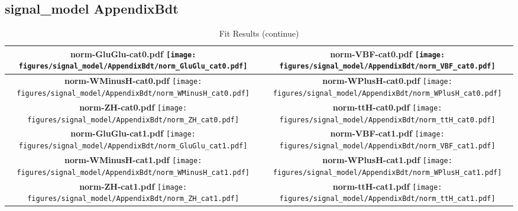 \subsection{signal\_model AppendixBdt}
\begin{longtable}{|c|c|}
\caption{Fit Results}
\endfirsthead
\caption{Fit Results (continue)}
\endhead
\hline
\parbox{0.47\textwidth}{
\centering
{\bfseries norm-GluGlu-cat0.pdf}
\texttt{[image: figures/signal\_model/AppendixBdt/norm\_GluGlu\_cat0.pdf]}
}
 & \parbox{0.47\textwidth}{
\centering
{\bfseries norm-VBF-cat0.pdf}
\texttt{[image: figures/signal\_model/AppendixBdt/norm\_VBF\_cat0.pdf]}
}
 \\
\hline
\parbox{0.47\textwidth}{
\centering
{\bfseries norm-WMinusH-cat0.pdf}
\texttt{[image: figures/signal\_model/AppendixBdt/norm\_WMinusH\_cat0.pdf]}
}
 & \parbox{0.47\textwidth}{
\centering
{\bfseries norm-WPlusH-cat0.pdf}
\texttt{[image: figures/signal\_model/AppendixBdt/norm\_WPlusH\_cat0.pdf]}
}
 \\
\hline
\parbox{0.47\textwidth}{
\centering
{\bfseries norm-ZH-cat0.pdf}
\texttt{[image: figures/signal\_model/AppendixBdt/norm\_ZH\_cat0.pdf]}
}
 & \parbox{0.47\textwidth}{
\centering
{\bfseries norm-ttH-cat0.pdf}
\texttt{[image: figures/signal\_model/AppendixBdt/norm\_ttH\_cat0.pdf]}
}
 \\
\hline
\parbox{0.47\textwidth}{
\centering
{\bfseries norm-GluGlu-cat1.pdf}
\texttt{[image: figures/signal\_model/AppendixBdt/norm\_GluGlu\_cat1.pdf]}
}
 & \parbox{0.47\textwidth}{
\centering
{\bfseries norm-VBF-cat1.pdf}
\texttt{[image: figures/signal\_model/AppendixBdt/norm\_VBF\_cat1.pdf]}
}
 \\
\hline
\parbox{0.47\textwidth}{
\centering
{\bfseries norm-WMinusH-cat1.pdf}
\texttt{[image: figures/signal\_model/AppendixBdt/norm\_WMinusH\_cat1.pdf]}
}
 & \parbox{0.47\textwidth}{
\centering
{\bfseries norm-WPlusH-cat1.pdf}
\texttt{[image: figures/signal\_model/AppendixBdt/norm\_WPlusH\_cat1.pdf]}
}
 \\
\hline
\parbox{0.47\textwidth}{
\centering
{\bfseries norm-ZH-cat1.pdf}
\texttt{[image: figures/signal\_model/AppendixBdt/norm\_ZH\_cat1.pdf]}
}
 & \parbox{0.47\textwidth}{
\centering
{\bfseries norm-ttH-cat1.pdf}
\texttt{[image: figures/signal\_model/AppendixBdt/norm\_ttH\_cat1.pdf]}
}
\end{longtable}

